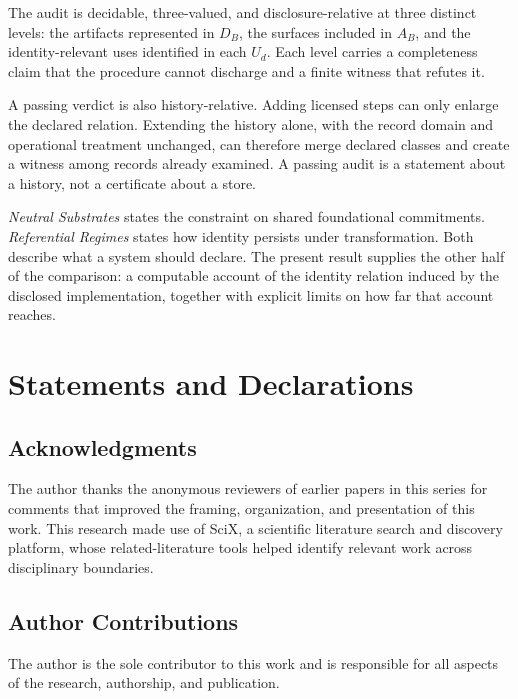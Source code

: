 \documentclass[11pt]{article}
\theoremstyle{plain}
\theoremstyle{definition}
\theoremstyle{remark}
\begin{document}
The audit is decidable, three-valued, and disclosure-relative at three distinct levels:
the artifacts represented in \(D_B\), the surfaces included in \(A_B\),
and the identity-relevant uses identified in each \(U_d\).
Each level carries a completeness claim that the procedure cannot discharge and a finite witness that refutes it.

A passing verdict is also history-relative.
Adding licensed steps can only enlarge the declared relation.
Extending the history alone,
with the record domain and operational treatment unchanged,
can therefore merge declared classes
and create a witness among records already examined.
A passing audit is a statement about a history,
not a certificate about a store.

\emph{Neutral Substrates} states the constraint on shared foundational commitments.
\emph{Referential Regimes} states how identity persists under transformation.
Both describe what a system should declare.
The present result supplies the other half of the comparison:
a computable account of the identity relation induced by the disclosed implementation,
together with explicit limits on how far that account reaches.

\section*{Statements and Declarations}

\subsection*{Acknowledgments}
The author thanks the anonymous reviewers of earlier papers in this series
for comments that improved the framing, organization, and presentation of this work.
This research made use of SciX,
a scientific literature search and discovery platform,
whose related-literature tools helped identify relevant work across disciplinary boundaries.

\subsection*{Author Contributions}
The author is the sole contributor to this work
and is responsible for all aspects of the research, authorship, and publication.
\end{document}
